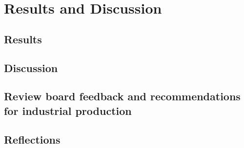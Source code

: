 \section{Results and Discussion}

\subsection{Results}

\subsection{Discussion}

\subsection{Review board feedback and recommendations for industrial production}

\subsection{Reflections}

